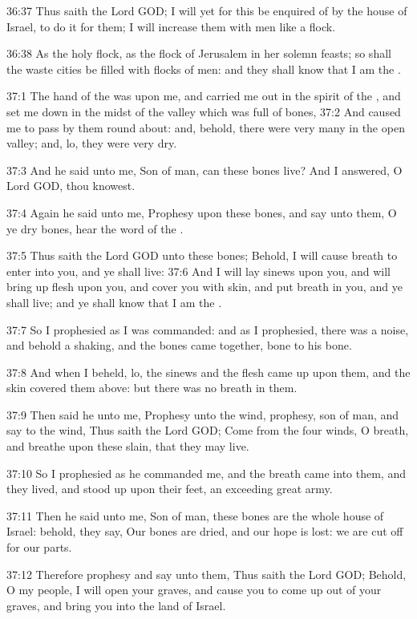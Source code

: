 36:37 Thus saith the Lord GOD; I will yet for this be enquired of by
the house of Israel, to do it for them; I will increase them with men
like a flock.

36:38 As the holy flock, as the flock of Jerusalem in her solemn
feasts; so shall the waste cities be filled with flocks of men: and
they shall know that I am the \LORD.

37:1 The hand of the \LORD was upon me, and carried me out in the
spirit of the \LORD, and set me down in the midst of the valley which
was full of bones, 37:2 And caused me to pass by them round about:
and, behold, there were very many in the open valley; and, lo, they
were very dry.

37:3 And he said unto me, Son of man, can these bones live? And I
answered, O Lord GOD, thou knowest.

37:4 Again he said unto me, Prophesy upon these bones, and say unto
them, O ye dry bones, hear the word of the \LORD.

37:5 Thus saith the Lord GOD unto these bones; Behold, I will cause
breath to enter into you, and ye shall live: 37:6 And I will lay
sinews upon you, and will bring up flesh upon you, and cover you with
skin, and put breath in you, and ye shall live; and ye shall know that
I am the \LORD.

37:7 So I prophesied as I was commanded: and as I prophesied, there
was a noise, and behold a shaking, and the bones came together, bone
to his bone.

37:8 And when I beheld, lo, the sinews and the flesh came up upon
them, and the skin covered them above: but there was no breath in
them.

37:9 Then said he unto me, Prophesy unto the wind, prophesy, son of
man, and say to the wind, Thus saith the Lord GOD; Come from the four
winds, O breath, and breathe upon these slain, that they may live.

37:10 So I prophesied as he commanded me, and the breath came into
them, and they lived, and stood up upon their feet, an exceeding great
army.

37:11 Then he said unto me, Son of man, these bones are the whole
house of Israel: behold, they say, Our bones are dried, and our hope
is lost: we are cut off for our parts.

37:12 Therefore prophesy and say unto them, Thus saith the Lord GOD;
Behold, O my people, I will open your graves, and cause you to come up
out of your graves, and bring you into the land of Israel.

